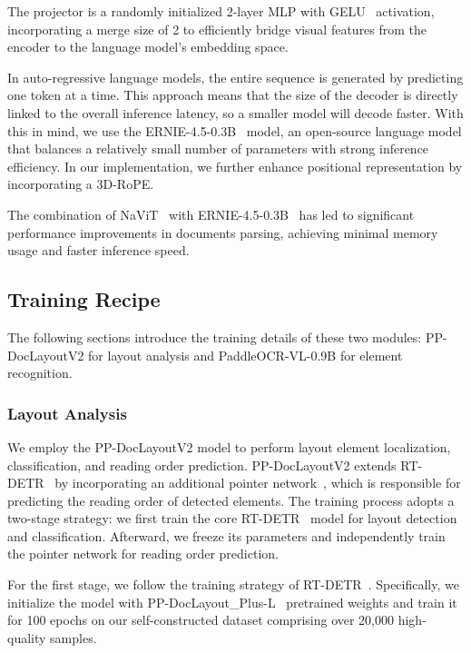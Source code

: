 \documentclass[11pt, a4paper,logo,  copyright, nonumbering]{paddleocr}
\begin{document}
The projector is a randomly initialized 2-layer MLP with GELU~\cite{hendrycks2016gaussian} activation, incorporating a merge size of 2 to efficiently bridge visual features from the encoder to the language model's embedding space.


In auto-regressive language models, the entire sequence is generated by predicting one token at a time. This approach means that the size of the decoder is directly linked to the overall inference latency, so a smaller model will decode faster. With this in mind, we use the ERNIE-4.5-0.3B~\cite{ernie2025technicalreport} model, an open-source language model that balances a relatively small number of parameters with strong inference efficiency. In our implementation, we further enhance positional representation by incorporating a 3D-RoPE\cite{bai2025qwen2}.

The combination of NaViT~\cite{dehghani2023patch} with ERNIE-4.5-0.3B~\cite{ernie2025technicalreport} has led to significant performance improvements in documents parsing, achieving minimal memory usage and faster inference speed.




\subsection{Training Recipe}

 The following sections introduce the training details of these two modules: PP-DocLayoutV2 for layout analysis and PaddleOCR-VL-0.9B for element recognition. 



\subsubsection{Layout Analysis}

\label{Layout Analysis}

We employ the PP-DocLayoutV2 model to perform layout element localization, classification, and reading order prediction. PP-DocLayoutV2 extends RT-DETR~\cite{zhao2024detrs} by incorporating an additional pointer network~\cite{hou2024relation}, which is responsible for predicting the reading order of detected elements. The training process adopts a two-stage strategy: we first train the core RT-DETR~\cite{zhao2024detrs} model for layout detection and classification. Afterward, we freeze its parameters and independently train the pointer network for reading order prediction.

For the first stage, we follow the training strategy of RT-DETR~\cite{zhao2024detrs}. Specifically, we initialize the model with PP-DocLayout\_Plus-L~\cite{sun2025pp} pretrained weights and train it for 100 epochs on our self-constructed dataset comprising over 20,000 high-quality samples.
\end{document}

